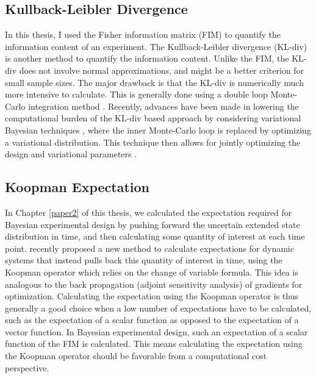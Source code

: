 \subsection{Kullback-Leibler Divergence}
In this thesis, I used the Fisher information matrix (FIM) to quantify the information content of an experiment. The Kullback-Leibler divergence (KL-div) is another method to quantify the information content. Unlike the FIM, the KL-div does not involve normal approximations, and might be a better criterion for small sample sizes. The major drawback is that the KL-div is numerically much more intensive to calculate.  This is generally done using a double loop Monte-Carlo integration method \parencite{ryan}. Recently, advances have been made in lowering the computational burden of the KL-div based approach by considering variational Bayesian techniques \parencite{foster}, where the inner Monte-Carlo loop is replaced by optimizing a variational distribution. This technique then allows for jointly optimizing the design and variational parameters \parencite{foster2}.
\subsection{Koopman Expectation}
In Chapter \ref{paper2} of this thesis, we calculated the expectation required for Bayesian experimental design by pushing forward the uncertain extended state distribution in time, and then calculating some quantity of interest at each time point. \textcite{gerlach} recently proposed a new method to calculate expectations for dynamic systems that instead pulls back this quantity of interest in time, using the Koopman operator which relies on the change of variable formula. This idea is analogous to the back propagation (adjoint sensitivity analysis) of gradients for optimization. Calculating the expectation using the Koopman operator is thus generally a good choice when a low number of expectations have to be calculated, such as the expectation of a scalar function as opposed to the expectation of a vector function. In Bayesian experimental design, such an expectation of a scalar function of the FIM is calculated. This means calculating the expectation using the Koopman operator should be favorable from a computational cost perspective. 
